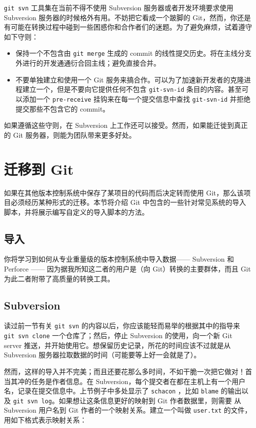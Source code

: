 \documentclass[a4paper]{book}
\begin{document}
\texttt{git svn} 工具集在当前不得不使用 Subversion 服务器或者开发环境要求使用 Subversion 服务器的时候格外有用。不妨把它看成一个跛脚的 Git，然而，你还是有可能在转换过程中碰到一些困惑你和合作者们的迷题。为了避免麻烦，试着遵守如下守则：

\begin{itemize}
\itemsep1pt\parskip0pt
\item
  保持一个不包含由 \texttt{git merge} 生成的 commit 的线性提交历史。将在主线分支外进行的开发通通衍合回主线；避免直接合并。
\item
  不要单独建立和使用一个 Git 服务来搞合作。可以为了加速新开发者的克隆进程建立一个，但是不要向它提供任何不包含 \texttt{git-svn-id} 条目的内容。甚至可以添加一个 \texttt{pre-receive} 挂钩来在每一个提交信息中查找 \texttt{git-svn-id} 并拒绝提交那些不包含它的 commit。
\end{itemize}

如果遵循这些守则，在 Subversion 上工作还可以接受。然而，如果能迁徙到真正的 Git 服务器，则能为团队带来更多好处。

\section{迁移到 Git}

如果在其他版本控制系统中保存了某项目的代码而后决定转而使用 Git，那么该项目必须经历某种形式的迁移。本节将介绍 Git 中包含的一些针对常见系统的导入脚本，并将展示编写自定义的导入脚本的方法。

\subsection{导入}

你将学习到如何从专业重量级的版本控制系统中导入数据------ Subversion 和 Perforce ------ 因为据我所知这二者的用户是（向 Git）转换的主要群体，而且 Git 为此二者附带了高质量的转换工具。

\subsection{Subversion}

读过前一节有关 \texttt{git svn} 的内容以后，你应该能轻而易举的根据其中的指导来 \texttt{git svn clone} 一个仓库了；然后，停止 Subversion 的使用，向一个新 Git server 推送，并开始使用它。想保留历史记录，所花的时间应该不过就是从 Subversion 服务器拉取数据的时间（可能要等上好一会就是了）。

然而，这样的导入并不完美；而且还要花那么多时间，不如干脆一次把它做对！首当其冲的任务是作者信息。在 Subversion，每个提交者在都在主机上有一个用户名，记录在提交信息中。上节例子中多处显示了 \texttt{schacon} ，比如 \texttt{blame} 的输出以及 \texttt{git svn log}。如果想让这条信息更好的映射到 Git 作者数据里，则需要 从 Subversion 用户名到 Git 作者的一个映射关系。建立一个叫做 \texttt{user.txt} 的文件，用如下格式表示映射关系：
\end{document}
